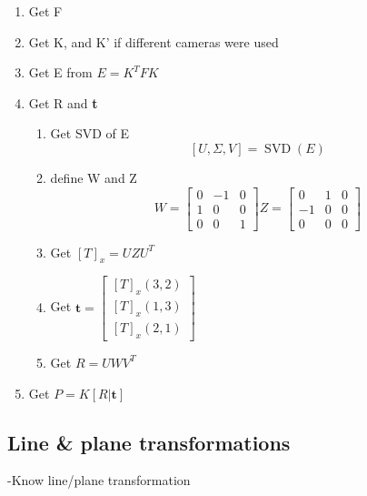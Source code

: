 \begin{enumerate}
    \item Get F
    \item Get K, and K' if different cameras were used
    \item Get E from \(E = K^T F K\)
    \item Get R and \textbf{t}
        \begin{enumerate}
            \item Get SVD of E \[ [U, \Sigma, V] = \operatorname{SVD}(E) \]
            \item define W and Z
                \[
                    W = \begin{bmatrix}
                        0   &   -1  & 0 \\
                        1   &   0   & 0 \\
                        0   &   0   & 1
                    \end{bmatrix}
                    Z = \begin{bmatrix}
                        0   &   1   & 0 \\
                        -1  &   0   & 0 \\
                        0   &   0   & 0
                    \end{bmatrix}
                \]
            \item Get \( {[T]}_x = U Z U^T\)
            \item Get \(\boldsymbol{t} = \begin{bmatrix}
                        {[T]}_x(3,2) \\
                        {[T]}_x(1,3) \\
                        {[T]}_x(2,1)
                \end{bmatrix}\)
            \item Get \(R = U W V^T\)
        \end{enumerate}
    \item Get \( P = K [R | \boldsymbol{t}] \)
\end{enumerate}



\subsection{Line \& plane transformations}

-Know line/plane transformation
